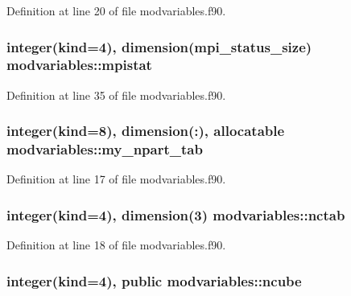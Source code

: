 Definition at line 20 of file modvariables.\-f90.

\hypertarget{classmodvariables_af6d0e7b2912dcb50b21940d5f8658be4}{
\subsubsection[{mpistat}]{\setlength{\rightskip}{0pt plus 5cm}integer(kind=4), dimension(mpi\-\_\-status\-\_\-size) modvariables\-::mpistat}}\label{classmodvariables_af6d0e7b2912dcb50b21940d5f8658be4}


Definition at line 35 of file modvariables.\-f90.

\hypertarget{classmodvariables_a64ba80f97884e73fedc7341570a93bd9}{
\subsubsection[{my\-\_\-npart\-\_\-tab}]{\setlength{\rightskip}{0pt plus 5cm}integer(kind=8), dimension(\-:), allocatable modvariables\-::my\-\_\-npart\-\_\-tab}}\label{classmodvariables_a64ba80f97884e73fedc7341570a93bd9}


Definition at line 17 of file modvariables.\-f90.

\hypertarget{classmodvariables_a0a00ccc148897945f3defb5f775e4c18}{
\subsubsection[{nctab}]{\setlength{\rightskip}{0pt plus 5cm}integer(kind=4), dimension(3) modvariables\-::nctab}}\label{classmodvariables_a0a00ccc148897945f3defb5f775e4c18}


Definition at line 18 of file modvariables.\-f90.

\hypertarget{classmodvariables_af8737100fdfbf6c331be1bb7c5ab0925}{
\subsubsection[{ncube}]{\setlength{\rightskip}{0pt plus 5cm}integer(kind=4), public modvariables\-::ncube}}\label{classmodvariables_af8737100fdfbf6c331be1bb7c5ab0925}


